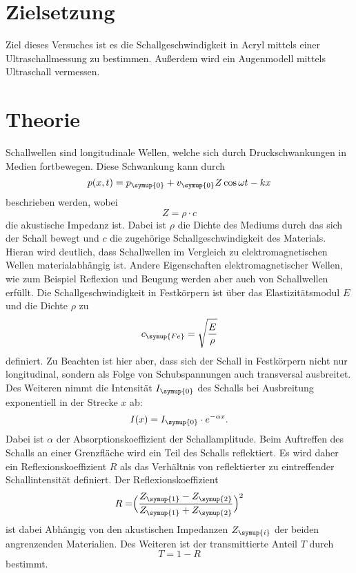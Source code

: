 \section{Zielsetzung}
    Ziel dieses Versuches ist es die Schallgeschwindigkeit in Acryl mittels einer Ultraschallmessung zu bestimmen. Außerdem wird ein Augenmodell
    mittels Ultraschall vermessen.
\section{Theorie}
\label{sec:Theorie}
    Schallwellen sind longitudinale Wellen, welche sich durch Druckschwankungen in Medien fortbewegen. Diese Schwankung kann durch
    \begin{equation}
    \label{eqn:welle}
        p(x,t) = p_{\symup{0}} + v_{\symup{0}} Z \cos{\omega t - k x}
    \end{equation}
    beschrieben werden, wobei 
    \begin{equation}
    \label{eqn:impedanz}
        Z = \rho \cdot c
    \end{equation}
    die akustische Impedanz ist. Dabei ist $\rho$ die 
    Dichte des Mediums durch das sich der Schall bewegt
    und $c$ die zugehörige Schallgeschwindigkeit des
    Materials. Hieran wird deutlich, dass Schallwellen im 
    Vergleich zu elektromagnetischen Wellen materialabhängig ist.
    Andere Eigenschaften elektromagnetischer Wellen, wie zum Beispiel
    Reflexion und Beugung werden aber auch von Schallwellen 
    erfüllt. Die Schallgeschwindigkeit in Festkörpern
    ist über das Elastizitätsmodul $E$ und die Dichte 
    $\rho$ zu 
    \begin{equation}
    \label{eqn:schallgeschw_festkoerper}
        c_{\symup{Fe}} = \sqrt{\frac{E}{\rho}}
    \end{equation}
    definiert. Zu Beachten ist hier aber, dass sich der 
    Schall in Festkörpern nicht nur longitudinal, sondern 
    als Folge von Schubspannungen auch transversal ausbreitet.
    Des Weiteren nimmt die Intensität $I_{\symup{0}}$ des Schalls bei Ausbreitung
    exponentiell in der Strecke $x$ ab:  
    \begin{equation}
    \label{eqn:abnahme}     
        I(x) = I_{\symup{0}} \cdot e^{-\alpha x}.
    \end{equation}
    Dabei ist $\alpha$ der Absorptionskoeffizient
    der Schallamplitude. 
    Beim Auftreffen des Schalls an einer Grenzfläche wird 
    ein Teil des Schalls reflektiert. Es wird daher ein 
    Reflexionskoeffizient $R$ als das Verhältnis von 
    reflektierter zu eintreffender Schallintensität definiert.
    Der Reflexionskoeffizient
    \begin{equation}
    \label{eqn:reflexionskoeffizient}
    R = \Bigr ( \frac{Z_{\symup{1}} - Z_{\symup{2}}} {Z_{\symup{1}} + Z_{\symup{2}}}   \Bigl)^2
    \end{equation}
    ist dabei Abhängig von den akustischen Impedanzen $Z_{\symup{i}}$
    der beiden angrenzenden Materialien.
    Des Weiteren ist der transmittierte Anteil $T$ durch
    \begin{equation}
    \label{eqn:transmission}
        T = 1 - R 
    \end{equation}
    bestimmt.

